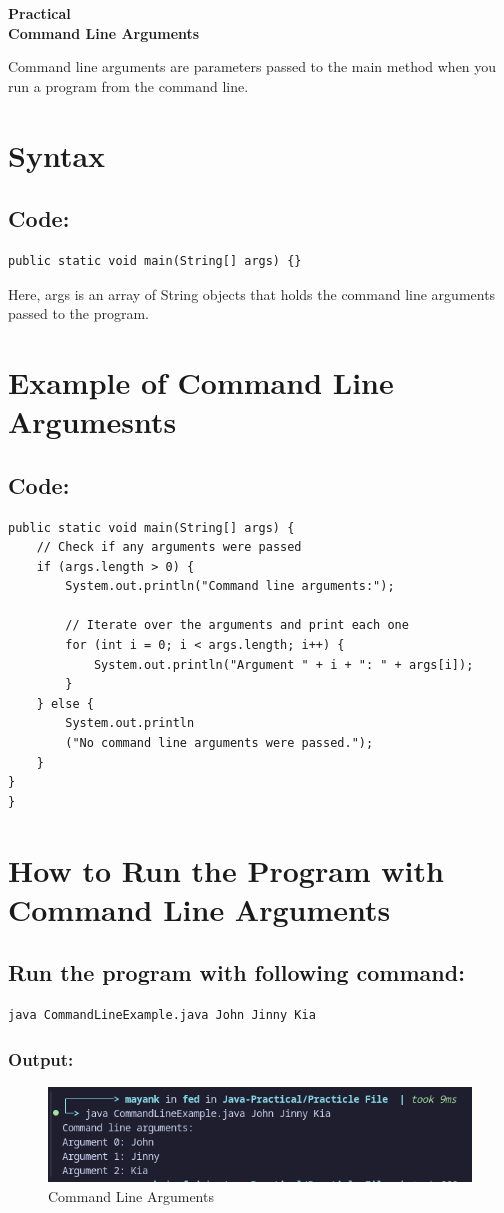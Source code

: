 \documentclass[a4paper,12pt]{article}
\newcounter{practicalno} %
\newcommand{\practicaltitle}[1]{
    \stepcounter{practicalno} %
    \newpage
    \begin{center}
        \vspace{1cm}
        \Large\textbf{Practical \thepracticalno} \\
        \vspace{0.5cm}
        \Large\textbf{#1} %
        \normalsize\vspace{1cm}
    \end{center}
}
\begin{document}
\setcounter{section}{0}

\practicaltitle{Command Line Arguments}
Command line arguments are parameters passed to the main method when you run a program from the command line.
\section{Syntax}
\subsection{Code: }
\begin{lstlisting}
public static void main(String[] args) {}
\end{lstlisting}
Here, args is an array of String objects that holds the command line arguments passed to the program.

\section{Example of Command Line Argumesnts}
\subsection{Code: }
\begin{lstlisting}
public static void main(String[] args) {
    // Check if any arguments were passed
    if (args.length > 0) {
        System.out.println("Command line arguments:");

        // Iterate over the arguments and print each one
        for (int i = 0; i < args.length; i++) {
            System.out.println("Argument " + i + ": " + args[i]);
        }
    } else {
        System.out.println
        ("No command line arguments were passed.");
    }
}
}
\end{lstlisting}
\section{How to Run the Program with Command Line Arguments}
\subsection{Run the program with following command: }
\begin{lstlisting}
java CommandLineExample.java John Jinny Kia
\end{lstlisting}
\subsubsection{Output: }
\begin{figure}[H]
    \centering
    \includegraphics[width=0.9\linewidth]{images/CLA.png}
    \caption{Command Line Arguments}
    \label{fig:sample_image}
\end{figure}
\end{document}
